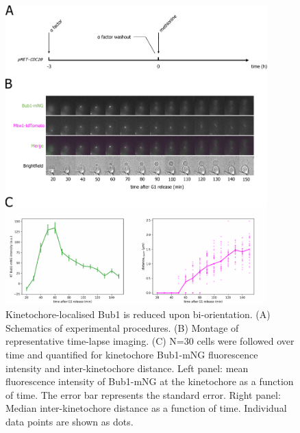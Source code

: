 \begin{figure}[htbp]
  \centering
  \includegraphics[width=0.9\textwidth]{figures/Bub1-mNG vs Mtw1-td.pdf}
  \caption[Kinetochore-localised Bub1 is reduced upon bi-orientation]{Kinetochore-localised Bub1 is reduced upon bi-orientation. (A) Schematics of experimental procedures. (B) Montage of representative time-lapse imaging. (C) N=30 cells were followed over time and quantified for kinetochore Bub1-mNG fluorescence intensity and inter-kinetochore distance. Left panel: mean fluorescence intensity of Bub1-mNG at the kinetochore as a function of time. The error bar represents the standard error. Right panel: Median inter-kinetochore distance as a function of time. Individual data points are shown as dots. }
  \label{fig:bub1mtw1}
\end{figure} 

